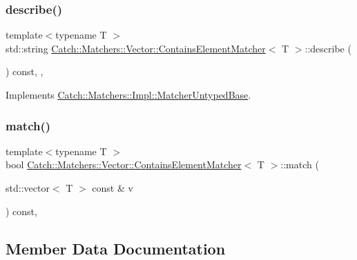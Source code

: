 \subsubsection{\texorpdfstring{describe()}{describe()}}
{\footnotesize\ttfamily template$<$typename T $>$ \\
std\+::string \mbox{\hyperlink{structCatch_1_1Matchers_1_1Vector_1_1ContainsElementMatcher}{Catch\+::\+Matchers\+::\+Vector\+::\+Contains\+Element\+Matcher}}$<$ T $>$\+::describe (\begin{DoxyParamCaption}{ }\end{DoxyParamCaption}) const\hspace{0.3cm}{\ttfamily [inline]}, {\ttfamily [override]}, {\ttfamily [virtual]}}



Implements \mbox{\hyperlink{classCatch_1_1Matchers_1_1Impl_1_1MatcherUntypedBase_a91d3a907dbfcbb596077df24f6e11fe2}{Catch\+::\+Matchers\+::\+Impl\+::\+Matcher\+Untyped\+Base}}.

\mbox{\label{structCatch_1_1Matchers_1_1Vector_1_1ContainsElementMatcher_a6a4be6e5642e267433d370649beb0fac}} 
\subsubsection{\texorpdfstring{match()}{match()}}
{\footnotesize\ttfamily template$<$typename T $>$ \\
bool \mbox{\hyperlink{structCatch_1_1Matchers_1_1Vector_1_1ContainsElementMatcher}{Catch\+::\+Matchers\+::\+Vector\+::\+Contains\+Element\+Matcher}}$<$ T $>$\+::match (\begin{DoxyParamCaption}\item[{std\+::vector$<$ T $>$ const \&}]{v }\end{DoxyParamCaption}) const\hspace{0.3cm}{\ttfamily [inline]}, {\ttfamily [override]}}



\subsection{Member Data Documentation}
\mbox{\label{structCatch_1_1Matchers_1_1Vector_1_1ContainsElementMatcher_ab7eada6c4bbce1d21b44773262f9cb23}} 
